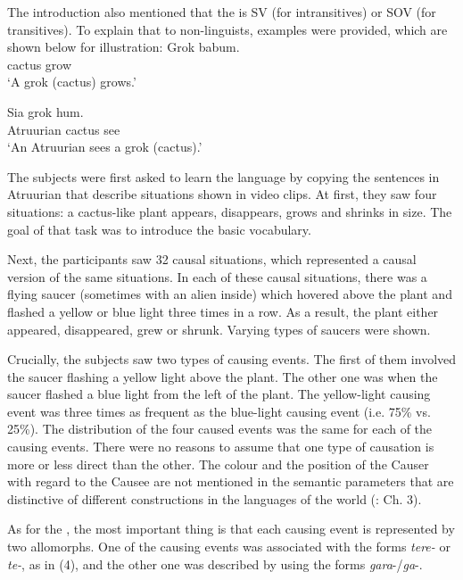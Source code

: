 \documentclass[output=paper]{langsci/langscibook}
\begin{document}
The introduction also mentioned that the  is SV (for intransitives) or SOV (for transitives). To explain that to non-linguists, examples were provided, which are shown below for illustration: 
\newpage
\ea\label{ex:levshina:2} 
\gll Grok         babum.\\
     cactus      grow\\
\glt ‘A grok (cactus) grows.'      
\z

\ea\label{ex:levshina:3}
\gll Sia                 grok            hum.\\
     Atruurian      cactus        see\\
\glt ‘An Atruurian sees a grok (cactus).'
\z

The subjects were first asked to learn the language by copying the sentences in Atruurian that describe situations shown in video clips. At first, they saw four situations: a cactus-like plant appears, disappears, grows and shrinks in size. The goal of that task was to introduce the basic vocabulary. 

Next, the participants saw 32 causal situations, which represented a causal version of the same situations. In each of these causal situations, there was a flying saucer (sometimes with an alien inside) which hovered above the plant and flashed a yellow or blue light three times in a row. As a result, the plant either appeared, disappeared, grew or shrunk. Varying types of saucers were shown. 

Crucially, the subjects saw two types of causing events. The first of them involved the saucer flashing a yellow light above the plant. The other one was when the saucer flashed a blue light from the left of the plant. The yellow-light causing event was three times as frequent as the blue-light causing event (i.e. 75\% vs. 25\%). The distribution of the four caused events was the same for each of the causing events. There were no reasons to assume that one type of causation is more or less direct than the other. The colour and the position of the Causer with regard to the Causee are not mentioned in the semantic parameters that are distinctive of different  constructions in the languages of the world (\citealt{Levshina2018_Effic}: Ch. 3). 

As for the , the most important thing is that each causing event is represented by two allomorphs. One of the causing events was associated with the forms \textit{tere-} or \textit{te-}, as in (4), and the other one was described by using the forms \textit{gara}{}-/\textit{ga}{}-.
\end{document}
